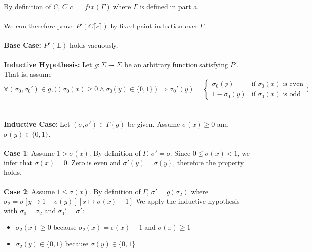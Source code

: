 \documentclass{article}
\begin{document}
\begin{enumerate}
\begin{enumerate}
        By definition of \(C\), \(C \llbracket c \rrbracket = fix(\Gamma)\) where \(\Gamma\) is defined in part a.
        \\~\\
        We can therefore prove \(P'(C \llbracket c \rrbracket)\) by fixed point induction over \(\Gamma\).
        \\~\\
        \textbf{Base Case:} \(P'(\bot)\) holds vacuously.
        \\~\\
        \textbf{Inductive Hypothesis:} Let \(g : \Sigma \rightharpoonup \Sigma\) be an arbitrary
        function satisfying \(P'\). That is, assume
        \begin{equation}
            \forall (\sigma_0, \sigma_0') \in g, \Big((\sigma_0(x) \geq 0
            \land \sigma_0(y) \in \{0, 1\})
            \Longrightarrow \sigma_0'(y) =
            \begin{cases}
                \sigma_0(y) & \text{if } \sigma_0(x) \text{ is even} \\
                1 - \sigma_0(y) & \text{if } \sigma_0(x) \text{ is odd}
            \end{cases}\Big)
        \end{equation}
        \\~\\
        \textbf{Inductive Case:} Let \((\sigma, \sigma') \in \Gamma(g)\) be given.
        Assume \(\sigma(x) \geq 0\) and \(\sigma(y) \in \{0, 1\}\).
        \\~\\
        \textbf{Case 1:} Assume \(1 > \sigma(x)\). By definition of \(\Gamma\), \(\sigma' = \sigma\).
        Since \(0 \leq \sigma(x) < 1\), we infer that \(\sigma(x) = 0\).
        Zero is even and \(\sigma'(y) = \sigma(y)\), therefore the property holds.
        \\~\\
        \textbf{Case 2:} Assume \(1 \leq \sigma(x)\).
        By definition of \(\Gamma\), \(\sigma' = g(\sigma_2)\)
        where \(\sigma_2 = \sigma[y \mapsto 1 - \sigma(y)][x \mapsto \sigma(x) - 1]\)
        We apply the inductive hypothesis with \(\sigma_0 = \sigma_2\) and \(\sigma_0' = \sigma'\):
        \begin{itemize}
            \item
            \(\sigma_2(x) \geq 0\) because \(\sigma_2(x) = \sigma(x) - 1\) and \(\sigma(x) \geq 1\)
            \item
            \(\sigma_2(y) \in \{0, 1\}\) because \(\sigma(y) \in \{0, 1\}\)

\end{itemize}
\end{enumerate}
\end{enumerate}
\end{document}
